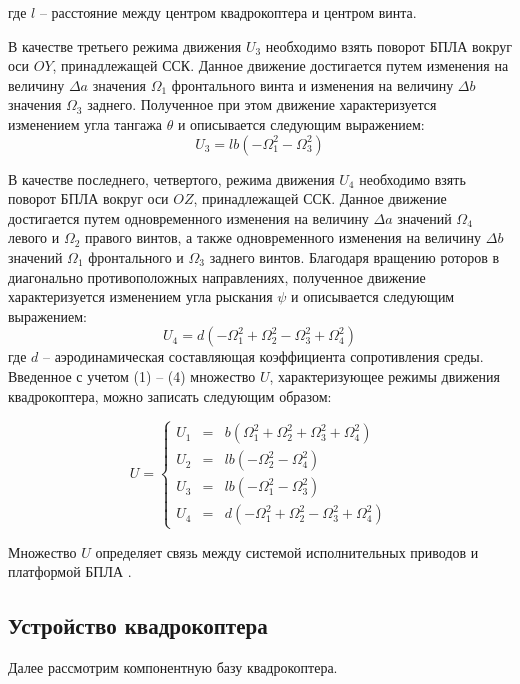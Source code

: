 где \(l\) -- расстояние между центром квадрокоптера и центром винта.

В качестве третьего режима движения \(U_{3}\) необходимо взять поворот БПЛА вокруг оси \(OY\), принадлежащей ССК. Данное движение достигается путем изменения на величину \(\Delta a\) значения \(\Omega_{1}\) фронтального винта и изменения на величину \(\Delta b\) значения \(\Omega_{3}\) заднего. Полученное при этом движение характеризуется изменением угла тангажа \(\theta\) и описывается следующим выражением:
\begin{equation}
U_{3}=lb(-\Omega_{1}^2-\Omega_{3}^2)
\end{equation}

В качестве последнего, четвертого, режима движения \(U_{4}\) необходимо взять поворот БПЛА вокруг оси \(OZ\), принадлежащей ССК. Данное движение достигается путем одновременного изменения на величину \(\Delta a\) значений \(\Omega_{4}\) левого и \(\Omega_{2}\) правого винтов, а также одновременного изменения на величину \(\Delta b\) значений \(\Omega_{1}\) фронтального и \(\Omega_{3}\) заднего винтов. Благодаря вращению роторов в диагонально противоположных направлениях, полученное движение характеризуется изменением угла рыскания \(\psi\) и описывается следующим выражением:
\begin{equation}
U_{4}=d(-\Omega_{1}^2+\Omega_{2}^2-\Omega_{3}^2+\Omega_{4}^2)
\end{equation}
где \(d\) -- аэродинамическая составляющая коэффициента сопротивления среды.
Введенное с учетом (1) -- (4) множество \(U\), характеризующее режимы
движения квадрокоптера, можно записать следующим образом:

\begin{equation}
U = \left\{ \begin{aligned}
U_{1}&=&b(\Omega_{1}^2+\Omega_{2}^2+\Omega_{3}^2+\Omega_{4}^2)\\
U_{2}&=&lb(-\Omega_{2}^2-\Omega_{4}^2)\\
U_{3}&=&lb(-\Omega_{1}^2-\Omega_{3}^2)\\
U_{4}&=&d(-\Omega_{1}^2+\Omega_{2}^2-\Omega_{3}^2+\Omega_{4}^2)
\end{aligned} \right.
\end{equation}

Множество \(U\) определяет связь между системой исполнительных приводов и платформой БПЛА \cite{mathmodel}.

\subsection{Устройство квадрокоптера}
Далее рассмотрим компонентную базу квадрокоптера.

